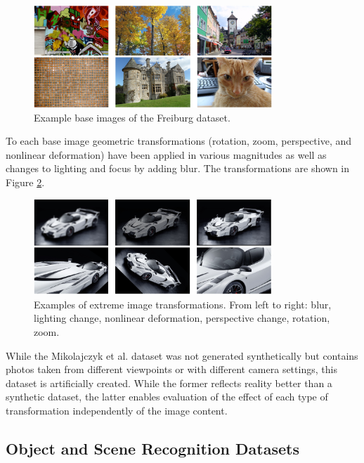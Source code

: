 \begin{figure}[H]
\begin{center}
\includegraphics[width=0.8\textwidth]{fig/MatchDBFreiburgBase}
\end{center}
\caption{Example base images of the Freiburg dataset.}
\label{fig:fischerDBdata}
\end{figure}

To each base image geometric transformations (rotation, zoom, perspective, and nonlinear
deformation) have been applied in various magnitudes as well as changes to lighting and focus by adding blur.
The transformations are shown in Figure \ref{fig:fischerDBtrans}. 

\begin{figure}[H]
\begin{center}
\includegraphics[width=0.8\textwidth]{fig/MatchDBFreiburgTrans}
\end{center}
\caption{Examples of extreme image transformations. From left to
right: blur, lighting change, nonlinear deformation, perspective change, rotation, zoom.}
\label{fig:fischerDBtrans}
\end{figure}

While the Mikolajczyk et al. dataset  \cite{Mikolajczyk:2005} was not generated synthetically but contains photos taken
from different viewpoints or with different camera settings, this dataset is artificially created. While the former reflects reality better than a
synthetic dataset, the latter enables evaluation of the effect of each type of transformation independently of the image content. 

\subsection{Object and Scene Recognition Datasets}
\label{subsec:obj_scene_db}

